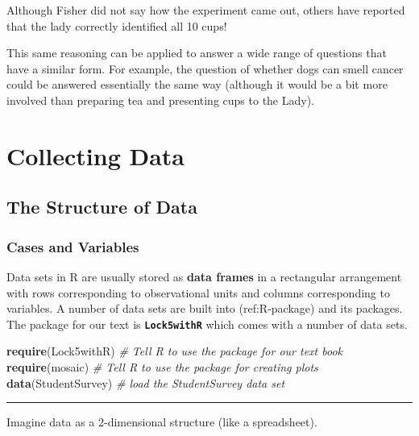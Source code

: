 \documentclass[]{book}
\newenvironment{Shaded}{\begin{snugshade}}{\end{snugshade}}
\newcommand{\CommentTok}[1]{\textcolor[rgb]{0.56,0.35,0.01}{\textit{#1}}}
\newcommand{\KeywordTok}[1]{\textcolor[rgb]{0.13,0.29,0.53}{\textbf{#1}}}
\newcommand{\NormalTok}[1]{#1}
\begin{document}
Although Fisher did not say how the experiment came out, others have reported that the lady correctly identified all 10 cups!
\citet{salsburg}

This same reasoning can be applied to answer a wide range of questions that have a similar form. For example, the question of whether dogs can smell cancer could be answered essentially the same way (although it would be a bit more involved than preparing tea and presenting cups to the Lady).

\hypertarget{collecting-data}{%
\chapter{Collecting Data}\label{collecting-data}}

\hypertarget{the-structure-of-data}{%
\section{The Structure of Data}\label{the-structure-of-data}}

\hypertarget{cases-and-variables}{%
\subsection{Cases and Variables}\label{cases-and-variables}}

Data sets in R are usually stored as \textbf{data frames} in a rectangular arrangement with rows corresponding to observational units and columns corresponding to variables. A number of data sets are built into (ref:R-package) and its packages. The package for our text is \textbf{\texttt{Lock5withR}} which comes with a number of data sets.

\begin{Shaded}
\begin{Highlighting}[]
\KeywordTok{require}\NormalTok{(Lock5withR)  }\CommentTok{# Tell R to use the package for our text book}
\KeywordTok{require}\NormalTok{(mosaic) }\CommentTok{# Tell R to use the package for creating plots}
\KeywordTok{data}\NormalTok{(StudentSurvey) }\CommentTok{# load the StudentSurvey data set}
\end{Highlighting}
\end{Shaded}

\begin{center}\rule{0.5\linewidth}{\linethickness}\end{center}

Imagine data as a 2-dimensional structure (like a spreadsheet).
\end{document}
